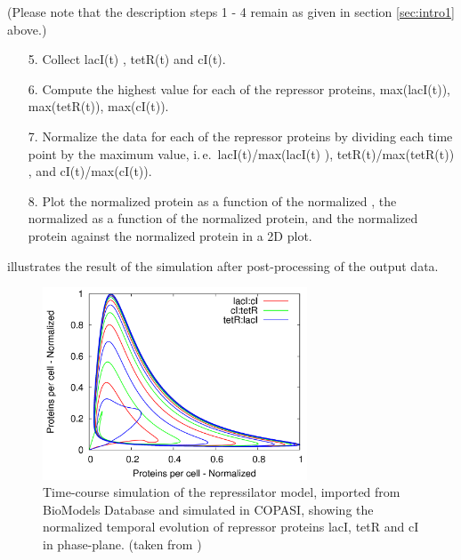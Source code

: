 (Please note that the description steps 1 - 4 remain as given in section \ref{sec:intro1} above.)
\begin{enumerate}
\item[5.]{Collect lacI(t) , tetR(t) and cI(t).}
\item[6.]{Compute the highest value for each of the repressor proteins,  max(lacI(t)), max(tetR(t)), max(cI(t)).}
\item[7.]{Normalize the data for each of the repressor proteins by dividing each time point by the maximum value, i.\,e.\ lacI(t)/max(lacI(t) ), tetR(t)/max(tetR(t)) , and cI(t)/max(cI(t)).}
\item[8.]{Plot the normalized  protein as a function of the normalized , the normalized   as a function of the normalized  protein, and the normalized  protein against the normalized  protein in a 2D plot.}
\end{enumerate}
 illustrates the result of the simulation after post-processing of the output data. 
\begin{figure}
\centering
\includegraphics[width=0.7\textwidth]{images/simEx2.png}
\caption{Time-course simulation of the repressilator model, imported from BioModels Database and simulated in COPASI, showing the normalized temporal evolution of repressor proteins lacI, tetR and cI in phase-plane. (taken from \cite{Waltemath:2011})}
\label{fig:simEx2}
\end{figure}


